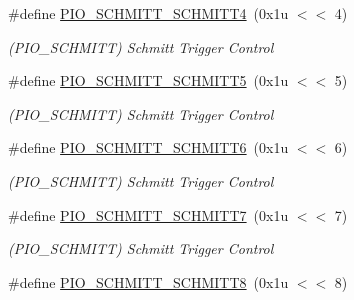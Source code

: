 \begin{DoxyCompactItemize}
\mbox{\label{group__SAMV71__PIO_ga1cbd90a2be60ddd28c33fd41b310fb03}} 
\#define \mbox{\hyperlink{group__SAMV71__PIO_ga1cbd90a2be60ddd28c33fd41b310fb03}{P\+I\+O\+\_\+\+S\+C\+H\+M\+I\+T\+T\+\_\+\+S\+C\+H\+M\+I\+T\+T4}}~(0x1u $<$$<$ 4)
\begin{DoxyCompactList}\small\item\em (P\+I\+O\+\_\+\+S\+C\+H\+M\+I\+TT) Schmitt Trigger Control \end{DoxyCompactList}\item 
\mbox{\label{group__SAMV71__PIO_ga980ce945c4767dd4b1d1b10c521fff97}} 
\#define \mbox{\hyperlink{group__SAMV71__PIO_ga980ce945c4767dd4b1d1b10c521fff97}{P\+I\+O\+\_\+\+S\+C\+H\+M\+I\+T\+T\+\_\+\+S\+C\+H\+M\+I\+T\+T5}}~(0x1u $<$$<$ 5)
\begin{DoxyCompactList}\small\item\em (P\+I\+O\+\_\+\+S\+C\+H\+M\+I\+TT) Schmitt Trigger Control \end{DoxyCompactList}\item 
\mbox{\label{group__SAMV71__PIO_ga9cf918b651ea14e01b8ddf8408c44eb0}} 
\#define \mbox{\hyperlink{group__SAMV71__PIO_ga9cf918b651ea14e01b8ddf8408c44eb0}{P\+I\+O\+\_\+\+S\+C\+H\+M\+I\+T\+T\+\_\+\+S\+C\+H\+M\+I\+T\+T6}}~(0x1u $<$$<$ 6)
\begin{DoxyCompactList}\small\item\em (P\+I\+O\+\_\+\+S\+C\+H\+M\+I\+TT) Schmitt Trigger Control \end{DoxyCompactList}\item 
\mbox{\label{group__SAMV71__PIO_ga603f0712ca9cb5554986818f0bbf8c22}} 
\#define \mbox{\hyperlink{group__SAMV71__PIO_ga603f0712ca9cb5554986818f0bbf8c22}{P\+I\+O\+\_\+\+S\+C\+H\+M\+I\+T\+T\+\_\+\+S\+C\+H\+M\+I\+T\+T7}}~(0x1u $<$$<$ 7)
\begin{DoxyCompactList}\small\item\em (P\+I\+O\+\_\+\+S\+C\+H\+M\+I\+TT) Schmitt Trigger Control \end{DoxyCompactList}\item 
\mbox{\label{group__SAMV71__PIO_ga5537053689e62c10e64c9b9c226076a9}} 
\#define \mbox{\hyperlink{group__SAMV71__PIO_ga5537053689e62c10e64c9b9c226076a9}{P\+I\+O\+\_\+\+S\+C\+H\+M\+I\+T\+T\+\_\+\+S\+C\+H\+M\+I\+T\+T8}}~(0x1u $<$$<$ 8)
$$
\end{DoxyCompactItemize}
